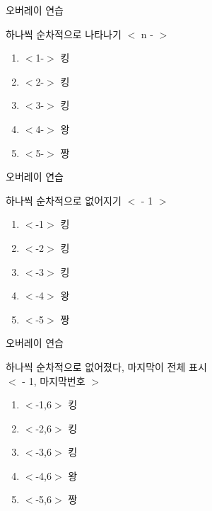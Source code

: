 \documentclass[10pt,blue,xcolor=pdftex,dvipsnames,table,handout]{beamer}
\begin{document}
		\begin{frame}[t]{오버레이 연습}

			\begin{block} {하나씩 순차적으로 나타나기 $<$ n - $>$ }
			\begin{enumerate}
			\item <1-> $<$1-$>$ 킹
			\item <2-> $<$2-$>$ 킹
			\item <3-> $<$3-$>$ 킹
			\item <4-> $<$4-$>$ 왕
			\item <5-> $<$5-$>$ 짱
			\end{enumerate}
			\end{block}

		\end{frame}


		\begin{frame}[t]{오버레이 연습}

			\begin{block} {하나씩 순차적으로 없어지기 $<$ - 1 $>$}
			\begin{enumerate}
			\item <-1> $<$-1$>$ 킹
			\item <-2> $<$-2$>$ 킹
			\item <-3> $<$-3$>$ 킹
			\item <-4> $<$-4$>$ 왕
			\item <-5> $<$-5$>$ 짱
			\end{enumerate}
			\end{block}

		\end{frame}

		\begin{frame}[t]{오버레이 연습}

			\begin{block} {하나씩 순차적으로 없어졌다, 마지막이 전체 표시\\
						 $<$ - 1, 마지막번호 $>$}
			\begin{enumerate}
			\item <-1,6> $<$-1,6$>$ 킹
			\item <-2,6> $<$-2,6$>$ 킹
			\item <-3,6> $<$-3,6$>$ 킹
			\item <-4,6> $<$-4,6$>$ 왕
			\item <-5,6> $<$-5,6$>$ 짱
			\end{enumerate}
			\end{block}

		\end{frame}
\end{document}

